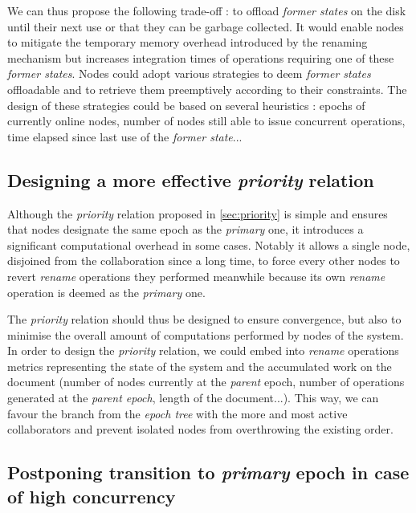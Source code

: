 \documentclass[sigplan,10pt]{acmart}
\begin{document}
We can thus propose the following trade-off : to offload \emph{former states} on the disk until their next use or that they can be garbage collected.
It would enable nodes to mitigate the temporary memory overhead introduced by the renaming mechanism but increases integration times of operations requiring one of these \emph{former states}.
Nodes could adopt various strategies to deem \emph{former states} offloadable and to retrieve them preemptively according to their constraints.
The design of these strategies could be based on several heuristics : epochs of currently online nodes, number of nodes still able to issue concurrent operations, time elapsed since last use of the \emph{former state}...

\subsection{Designing a more effective \emph{priority} relation}
\label{sec:designing-more-effective-priority-relation}

Although the \emph{priority} relation proposed in \autoref{sec:priority} is simple and ensures that nodes designate the same epoch as the \emph{primary} one, it introduces a significant computational overhead in some cases.
Notably it allows a single node, disjoined from the collaboration since a long time, to force every other nodes to revert \emph{rename} operations they performed meanwhile because its own \emph{rename} operation is deemed as the \emph{primary} one.

The \emph{priority} relation should thus be designed to ensure convergence, but also to minimise the overall amount of computations performed by nodes of the system.
In order to design the \emph{priority} relation, we could embed into \emph{rename} operations metrics representing the state of the system and the accumulated work on the document (number of nodes currently at the \emph{parent} epoch, number of operations generated at the \emph{parent epoch}, length of the document...).
This way, we can favour the branch from the \emph{epoch tree} with the more and most active collaborators and prevent isolated nodes from overthrowing the existing order.

\subsection{Postponing transition to \emph{primary} epoch in case of high concurrency}
\label{sec:postponing-transition-to-new-epoch}
\end{document}

